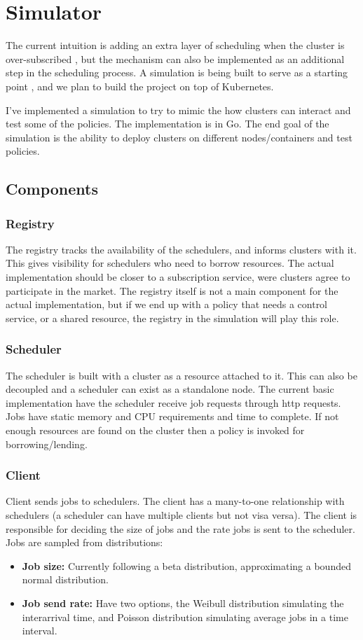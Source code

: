 \section{Simulator}
The current intuition is adding an extra layer 
of scheduling when the cluster is over-subscribed \cite{zaharia_delay_2010}, 
but the mechanism can also be implemented as an additional step in the scheduling process. 
A simulation is being built to serve as a starting point \cite{sched-github}, 
and we plan to build the project on top of Kubernetes.

I've implemented a simulation to try to mimic the how clusters can interact and test some of the policies. 
The implementation is in Go. The end goal of the simulation is the ability to deploy clusters on different 
nodes/containers and test policies.

\subsection{Components}
\subsubsection{Registry}
The registry tracks the availability of the schedulers, and informs clusters with it. 
This gives visibility for schedulers who need to borrow resources. 
The actual implementation should be closer to a subscription service, 
were clusters agree to participate in the market. The registry itself is not a main 
component for the actual implementation, but if we end up with a policy that needs a control service, 
or a shared resource, the registry in the simulation will play this role.

\subsubsection{Scheduler}
The scheduler is built with a cluster as a resource attached to it. 
This can also be decoupled and a scheduler can exist as a standalone node. 
The current basic implementation have the scheduler receive job requests through http requests. 
Jobs have static memory and CPU requirements and time to complete. If not enough resources 
are found on the cluster then a policy is invoked for borrowing/lending.


\subsubsection{Client}
Client sends jobs to schedulers. The client has a many-to-one relationship with schedulers
(a scheduler can have multiple clients but not visa versa).
The client is responsible for deciding the size of jobs and the rate jobs is sent to the scheduler.
Jobs are sampled from distributions:
\begin{itemize}
    \item \textbf{Job size:} Currently following a beta distribution, approximating a bounded normal distribution. 
    \item \textbf{Job send rate:} Have two options, the Weibull distribution simulating the interarrival time, and 
    Poisson distribution simulating average jobs in a time interval.
\end{itemize}